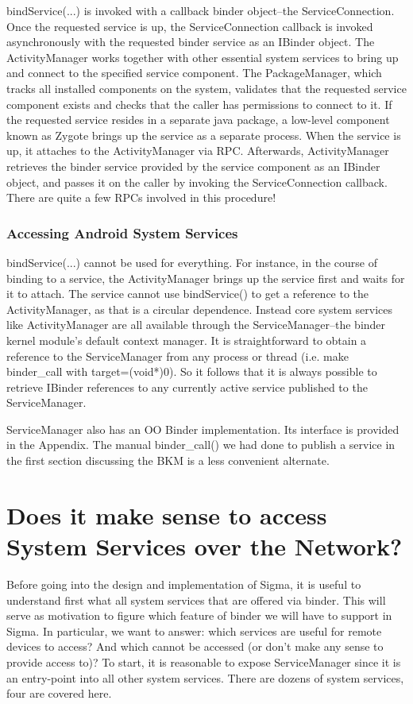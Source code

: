 \documentclass[prodmode]{acmlarge}
\begin{document}
bindService(...) is invoked with a callback binder object--the ServiceConnection. Once the requested service is up, the ServiceConnection callback is invoked asynchronously with the requested binder service as an IBinder object. The ActivityManager works together with other essential system services to bring up and connect to the specified service component. The PackageManager, which tracks all installed components on the system, validates that the requested service component exists and checks that the caller has permissions to connect to it. If the requested service resides in a separate java package, a low-level component known as Zygote brings up the service as a separate process. When the service is up, it attaches to the ActivityManager via RPC. Afterwards, ActivityManager retrieves the binder service provided by the service component as an IBinder object, and passes it on the caller by invoking the ServiceConnection callback. There are quite a few RPCs involved in this procedure!

\subsubsection{Accessing Android System Services}
bindService(...) cannot be used for everything. For instance, in the course of binding to a service, the ActivityManager brings up the service first and waits for it to attach. The service cannot use bindService() to get a reference to the ActivityManager, as that is a circular dependence. Instead core system services like ActivityManager are all available through the ServiceManager--the binder kernel module's default context manager. It is straightforward to obtain a reference to the ServiceManager from any process or thread (i.e. make binder\_call with target=(void*)0). So it follows that it is always possible to retrieve IBinder references to any currently active service published to the ServiceManager.

ServiceManager also has an OO Binder implementation. Its interface is provided in the Appendix. The manual binder\_call() we had done to publish a service in the first section discussing the BKM is a less convenient alternate.

\section{Does it make sense to access System Services over the Network?}
Before going into the design and implementation of Sigma, it is useful to understand first what all system services that are offered via binder. This will serve as motivation to figure which feature of binder we will have to support in Sigma. In particular, we want to answer: which services are useful for remote devices to access? And which cannot be accessed (or don't make any sense to provide access to)?  To start, it is reasonable to expose ServiceManager since it is an entry-point into all other system services. There are dozens of system services, four are covered here.
\end{document}

